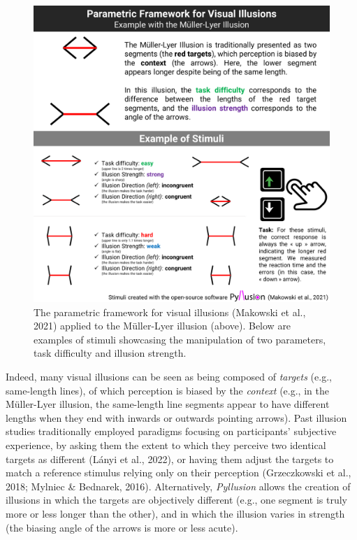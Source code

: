 \documentclass[
  man,floatsintext]{apa6}
\begin{document}
\begin{figure}
\includegraphics[width=1\linewidth]{figures/Figure1} \caption{The parametric framework for visual illusions (Makowski et al., 2021) applied to the Müller-Lyer illusion (above). Below are examples of stimuli showcasing the manipulation of two parameters, task difficulty and illusion strength.}\label{fig:unnamed-chunk-2}
\end{figure}

Indeed, many visual illusions can be seen as being composed of \emph{targets} (e.g., same-length lines), of which perception is biased by the \emph{context} (e.g., in the Müller-Lyer illusion, the same-length line segments appear to have different lengths when they end with inwards or outwards pointing arrows). Past illusion studies traditionally employed paradigms focusing on participants' subjective experience, by asking them the extent to which they perceive two identical targets as different (Lányi et al., 2022), or having them adjust the targets to match a reference stimulus relying only on their perception (Grzeczkowski et al., 2018; Mylniec \& Bednarek, 2016). Alternatively, \emph{Pyllusion} allows the creation of illusions in which the targets are objectively different (e.g., one segment is truly more or less longer than the other), and in which the illusion varies in strength (the biasing angle of the arrows is more or less acute).
\end{document}
